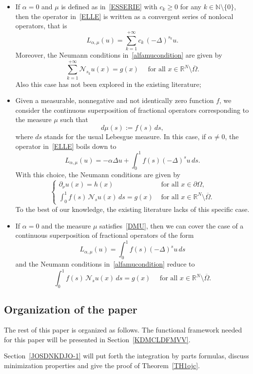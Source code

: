 \documentclass[12pt,a4paper,intlimits,sumlimits]{amsart}
\def \N {\mathbb{N}}
\def \R {\mathbb{R}}
\def \Ns {\mathscr{N}_{s}}
\theoremstyle{definition}
\theoremstyle{plain}
\numberwithin{equation}{section}
\renewcommand{\ge}{\geqslant}
\begin{document}
\begin{itemize}
\item If $\alpha=0$ and $\mu$ is defined as in~\eqref{ESSERIE} with $c_k\ge 0$ for any $k\in\N\setminus\{0\}$, then the operator in~\eqref{ELLE} is written as a convergent series of nonlocal operators, that is
\[
L_{\alpha, \mu} (u) = \sum_{k=1}^{+\infty} c_k\, (-\Delta)^{s_k} u.
\]
Moreover, the Neumann conditions in~\eqref{alfamucondition} are given by
\[
\sum_{k=1}^{+\infty}\mathscr N_{s_k} u (x)= g(x) \quad\mbox{ for all }x\in \R^N \setminus \overline{\Omega}.
\]
Also this case has not been explored in the existing literature;
\item Given a measurable, nonnegative and not identically zero function $f$, we consider the continuous superposition of fractional operators corresponding to the measure $\mu$ such that
\begin{equation}\label{DMU}
d\mu(s):= f(s) \, ds,
\end{equation}
where $ds$ stands for the usual Lebesgue measure. In this case,  if $\alpha\neq 0$, the operator in~\eqref{ELLE} boils down to
\[
L_{\alpha, \mu} (u) = -\alpha \Delta u + \int_0^1 f(s) (-\Delta)^s u \, ds.
\]
With this choice, the Neumann conditions are given by
\[
\begin{cases}
\partial_\nu u(x)=h (x)& \mbox{ for all } x\in \partial\Omega,\\
\displaystyle\int_0^1 f(s)\, \Ns u(x) \, ds = g(x)&\mbox{ for all }x\in \R^N \setminus \overline{\Omega}.
\end{cases}
\]
To the best of our knowledge,  the existing literature lacks of this specific case.
\item If $\alpha=0$ and the measure $\mu$ satisfies~\eqref{DMU}, then we can cover the case of a continuous superposition of fractional operators of the form
\[
L_{\alpha, \mu} (u) =  \int_0^1 f(s) (-\Delta)^s u \, ds
\]
and the Neumann conditions in~\eqref{alfamucondition} reduce to
\[
\int_0^1 f(s)\, \Ns u(x) \, ds = g(x) \quad\mbox{ for all }x\in \R^N \setminus \overline{\Omega}.
\]
\end{itemize}

\subsection{Organization of the paper}
The rest of this paper is organized as follows. The functional framework needed for this paper will be presented in Section~\ref{KDMCLDFMVV}. 

Section~\ref{JOSDNKDJO-1} will put forth
the integration by parts formulas, discuss minimization properties
and give the proof of Theorem~\ref{TH1ojc}.
\end{document}
